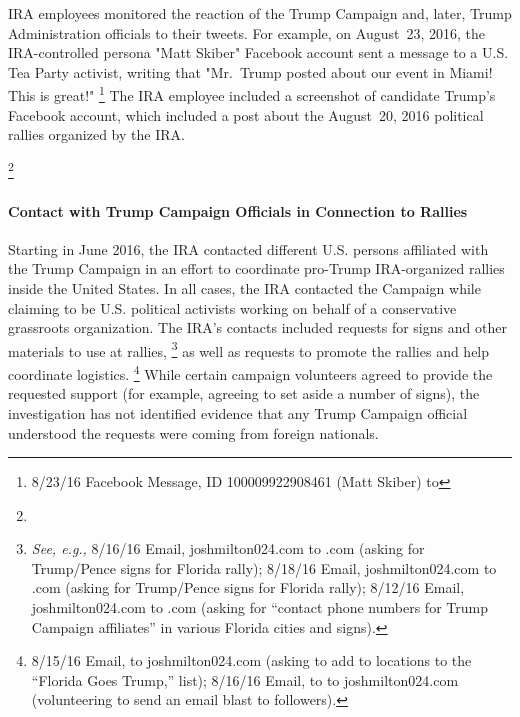 IRA employees monitored the reaction of the Trump Campaign and, later, Trump Administration officials to their tweets.
For example, on August~23, 2016, the IRA-controlled persona "Matt Skiber" Facebook account sent a message to a U.S. Tea Party activist, writing that "Mr.~Trump posted about our event in Miami! This is great!"%
\footnote{8/23/16 Facebook Message, ID 100009922908461 (Matt Skiber) to }
The IRA employee included a screenshot of candidate Trump's Facebook account, which included a post about the August~20, 2016 political rallies organized by the IRA\null.

\footnote{}

\paragraph{Contact with Trump Campaign Officials in Connection to Rallies}

Starting in June 2016, the IRA contacted different U.S. persons affiliated with the Trump Campaign in an effort to coordinate pro-Trump IRA-organized rallies inside the United States.
In all cases, the IRA contacted the Campaign while claiming to be U.S. political activists working on behalf of a conservative grassroots organization.
The IRA's contacts included requests for signs and other materials to use at rallies,%
\footnote{\textit{See, e.g.,} 8/16/16 Email, joshmilton024\@gmail.com to \@donaldtrump.com (asking for Trump/Pence signs for Florida rally);
8/18/16 Email, joshmilton024\@gmail.com to \@donaldtrump.com (asking for Trump/Pence signs for Florida rally);
8/12/16 Email, joshmilton024\@gmail.com to \@donaldtrump.com (asking for ``contact phone numbers for Trump Campaign affiliates'' in various Florida cities and signs).
}
as well as requests to promote the rallies and help coordinate logistics.%
\footnote{8/15/16 Email,  to joshmilton024\@gmail.com (asking to add to locations to the ``Florida Goes Trump,'' list);
8/16/16 Email, to  to joshmilton024\@gmail.com (volunteering to send an email blast to followers).}
While certain campaign volunteers agreed to provide the requested support (for example, agreeing to set aside a number of signs), the investigation has not identified evidence that any Trump Campaign official understood the requests were coming from foreign nationals.

